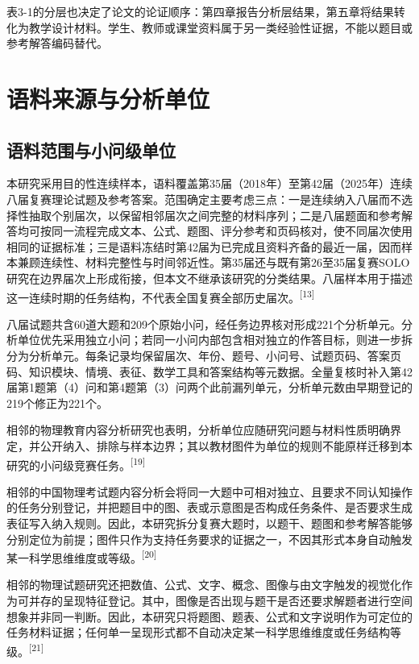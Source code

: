 \documentclass[
  12pt,
  a4paper,twoside,openany]{ctexbook}
\begin{document}
表3-1的分层也决定了论文的论证顺序：第四章报告分析层结果，第五章将结果转化为教学设计材料。学生、教师或课堂资料属于另一类经验性证据，不能以题目或参考解答编码替代。

\section{语料来源与分析单位}\label{ux8bedux6599ux6765ux6e90ux4e0eux5206ux6790ux5355ux4f4d}

\subsection{语料范围与小问级单位}\label{ux8bedux6599ux8303ux56f4ux4e0eux5c0fux95eeux7ea7ux5355ux4f4d}

本研究采用目的性连续样本，语料覆盖第35届（2018年）至第42届（2025年）连续八届复赛理论试题及参考答案。范围确定主要考虑三点：一是连续纳入八届而不选择性抽取个别届次，以保留相邻届次之间完整的材料序列；二是八届题面和参考解答均可按同一流程完成文本、公式、题图、评分参考和页码核对，使不同届次使用相同的证据标准；三是语料冻结时第42届为已完成且资料齐备的最近一届，因而样本兼顾连续性、材料完整性与时间邻近性。第35届还与既有第26至35届复赛SOLO研究在边界届次上形成衔接，但本文不继承该研究的分类结果。八届样本用于描述这一连续时期的任务结构，不代表全国复赛全部历史届次。\textsuperscript{[13]}

八届试题共含60道大题和209个原始小问，经任务边界核对形成221个分析单元。分析单位优先采用独立小问；若同一小问内部包含相对独立的作答目标，则进一步拆分为分析单元。每条记录均保留届次、年份、题号、小问号、试题页码、答案页码、知识模块、情境、表征、数学工具和答案结构等元数据。全量复核时补入第42届第1题第（4）问和第4题第（3）问两个此前漏列单元，分析单元数由早期登记的219个修正为221个。

相邻的物理教育内容分析研究也表明，分析单位应随研究问题与材料性质明确界定，并公开纳入、排除与样本边界；其以教材图件为单位的规则不能原样迁移到本研究的小问级竞赛任务。\textsuperscript{[19]}

相邻的中国物理考试题内容分析会将同一大题中可相对独立、且要求不同认知操作的任务分别登记，并把题目中的图、表或示意图是否构成任务条件、是否要求生成表征写入纳入规则。因此，本研究拆分复赛大题时，以题干、题图和参考解答能够分别定位为前提；图件只作为支持任务要求的证据之一，不因其形式本身自动触发某一科学思维维度或等级。\textsuperscript{[20]}

相邻的物理试题研究还把数值、公式、文字、概念、图像与由文字触发的视觉化作为可并存的呈现特征登记。其中，图像是否出现与题干是否还要求解题者进行空间想象并非同一判断。因此，本研究只将题图、题表、公式和文字说明作为可定位的任务材料证据；任何单一呈现形式都不自动决定某一科学思维维度或任务结构等级。\textsuperscript{[21]}
\end{document}
